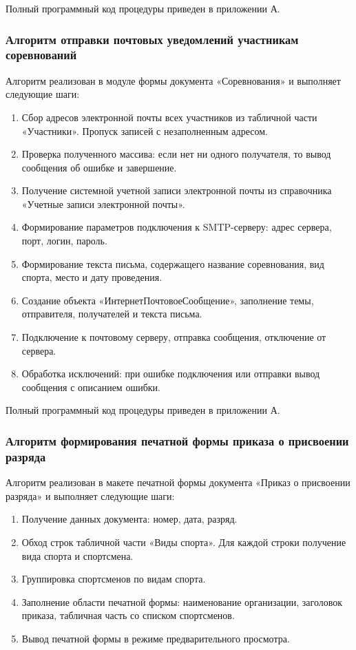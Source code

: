 Полный программный код процедуры приведен в приложении А.

\subsubsection{Алгоритм отправки почтовых уведомлений участникам соревнований}

Алгоритм реализован в модуле формы документа «Соревнования» и выполняет следующие шаги:

\begin{enumerate}
	\item Сбор адресов электронной почты всех участников из табличной части «Участники». Пропуск записей с незаполненным адресом.
	\item Проверка полученного массива: если нет ни одного получателя, то вывод сообщения об ошибке и завершение.
	\item Получение системной учетной записи электронной почты из справочника «Учетные записи электронной почты».
	\item Формирование параметров подключения к SMTP-серверу: адрес сервера, порт, логин, пароль.
	\item Формирование текста письма, содержащего название соревнования, вид спорта, место и дату проведения.
	\item Создание объекта «ИнтернетПочтовоеСообщение», заполнение темы, отправителя, получателей и текста письма.
	\item Подключение к почтовому серверу, отправка сообщения, отключение от сервера.
	\item Обработка исключений: при ошибке подключения или отправки  вывод сообщения с описанием ошибки.
\end{enumerate}

Полный программный код процедуры приведен в приложении А.

\subsubsection{Алгоритм формирования печатной формы приказа о присвоении разряда}

Алгоритм реализован в макете печатной формы документа «Приказ о присвоении разряда» и выполняет следующие шаги:

\begin{enumerate}
	\item Получение данных документа: номер, дата, разряд.
	\item Обход строк табличной части «Виды спорта». Для каждой строки получение вида спорта и спортсмена.
	\item Группировка спортсменов по видам спорта.
	\item Заполнение области печатной формы: наименование организации, заголовок приказа, табличная часть со списком спортсменов.
	\item Вывод печатной формы в режиме предварительного просмотра.
\end{enumerate}

